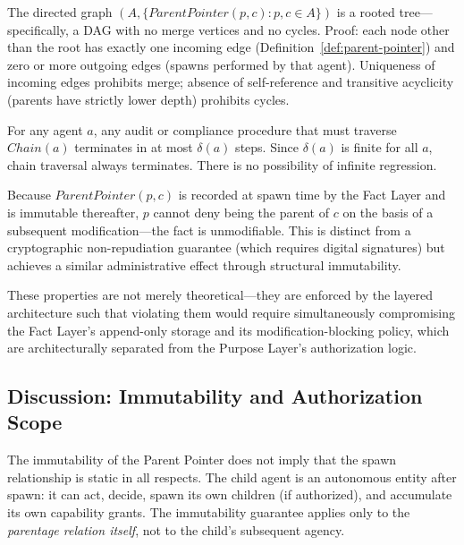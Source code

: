 \begin{property}
\label{prop:tree-dag}
The directed graph $(A, \{ParentPointer(p,c) : p,c \in A\})$ is a rooted tree—specifically, a DAG with no merge vertices and no cycles. Proof: each node other than the root has exactly one incoming edge (Definition~\ref{def:parent-pointer}) and zero or more outgoing edges (spawns performed by that agent). Uniqueness of incoming edges prohibits merge; absence of self-reference and transitive acyclicity (parents have strictly lower depth) prohibits cycles.
\end{property}

\begin{property}
\label{prop:bounded-audit}
For any agent $a$, any audit or compliance procedure that must traverse $Chain(a)$ terminates in at most $\delta(a)$ steps. Since $\delta(a)$ is finite for all $a$, chain traversal always terminates. There is no possibility of infinite regression.
\end{property}

\begin{property}
\label{prop:non-repudiation}
Because $ParentPointer(p, c)$ is recorded at spawn time by the Fact Layer and is immutable thereafter, $p$ cannot deny being the parent of $c$ on the basis of a subsequent modification—the fact is unmodifiable. This is distinct from a cryptographic non-repudiation guarantee (which requires digital signatures) but achieves a similar administrative effect through structural immutability.
\end{property}

These properties are not merely theoretical—they are enforced by the layered architecture such that violating them would require simultaneously compromising the Fact Layer's append-only storage and its modification-blocking policy, which are architecturally separated from the Purpose Layer's authorization logic.

\subsection{Discussion: Immutability and Authorization Scope}

The immutability of the Parent Pointer does not imply that the spawn relationship is static in all respects. The child agent is an autonomous entity after spawn: it can act, decide, spawn its own children (if authorized), and accumulate its own capability grants. The immutability guarantee applies only to the \textit{parentage relation itself}, not to the child's subsequent agency.

